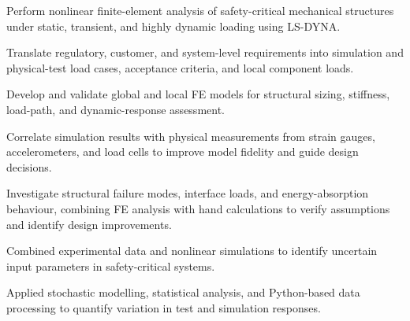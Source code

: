 
\begin{cvitems}
  \item Perform nonlinear finite-element analysis of safety-critical mechanical structures under static, transient, and highly dynamic loading using LS-DYNA.
  \item Translate regulatory, customer, and system-level requirements into simulation and physical-test load cases, acceptance criteria, and local component loads.
  \item Develop and validate global and local FE models for structural sizing, stiffness, load-path, and dynamic-response assessment.
  \item Correlate simulation results with physical measurements from strain gauges, accelerometers, and load cells to improve model fidelity and guide design decisions.
  \item Investigate structural failure modes, interface loads, and energy-absorption behaviour, combining FE analysis with hand calculations to verify assumptions and identify design improvements.
\end{cvitems}

\vspace{1em}
\begin{cvitems}
  \item Combined experimental data and nonlinear simulations to identify uncertain input parameters in safety-critical systems.
  \item Applied stochastic modelling, statistical analysis, and Python-based data processing to quantify variation in test and simulation responses.
\end{cvitems}


